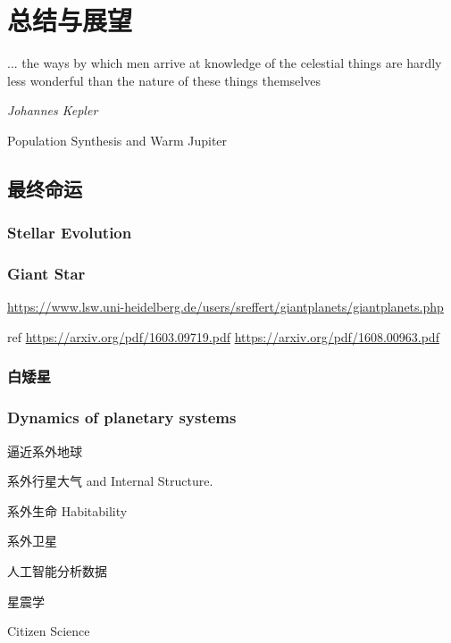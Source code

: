 \chapter{总结与展望} \label{chapter:conclusion}

\epigraph{... the ways by which men arrive at knowledge of the celestial things are hardly less wonderful than the nature of these things themselves}{\textit{Johannes Kepler}}


Population Synthesis and Warm Jupiter

\section{最终命运} \label{sec:fateofplanets}

\subsection{Stellar Evolution} 

\subsection{Giant Star}  \label{sec:hjofgiants}

\url{https://www.lsw.uni-heidelberg.de/users/sreffert/giantplanets/giantplanets.php}

ref
\url{https://arxiv.org/pdf/1603.09719.pdf}
\url{https://arxiv.org/pdf/1608.00963.pdf}


\subsection{白矮星}

\subsection{Dynamics of planetary systems}



逼近系外地球

系外行星大气 and Internal Structure.

系外生命 Habitability

系外卫星


人工智能分析数据

星震学

Citizen Science

